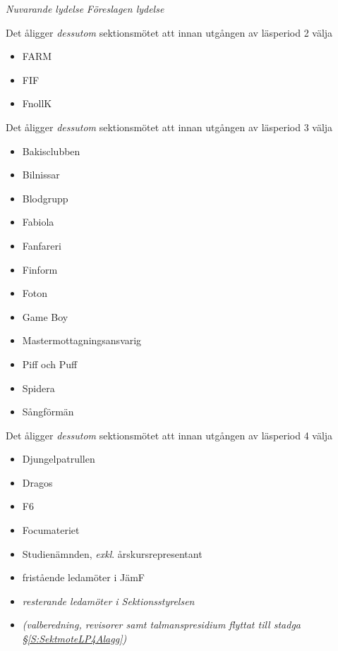 \documentclass{article}
\newenvironment{lydelse}
    {\begin{paracol}{2}%
        \emph{Nuvarande lydelse}%
        \switchcolumn%
        \emph{Föreslagen lydelse}%
    \end{paracol}%
    \begin{enumerate}[label=\thesubsection.\arabic*]%
    \begin{paracol}{2}%
    }{\end{paracol}\end{enumerate}}
\begin{document}
\begin{lydelse}
    \vspace{1.2em}
    \item Det åligger \emph{dessutom} sektionsmötet att innan utgången av läsperiod 2 välja
    \begin{itemize}
        \item FARM
        \item FIF
        \item FnollK
    \end{itemize}

    \vspace{4.8em}
    \item Det åligger \emph{dessutom} sektionsmötet att innan utgången av läsperiod 3 välja
    \begin{itemize}
        \item Bakisclubben
        \item Bilnissar
        \item Blodgrupp
        \item Fabiola
        \item Fanfareri
        \item Finform
        \item Foton
        \item Game Boy
        \item Mastermottagningsansvarig
        \item Piff och Puff
        \item Spidera
        \item Sångförmän
    \end{itemize}

    \item[]
    \item Det åligger \emph{dessutom} sektionsmötet att innan utgången av läsperiod 4 välja
    \begin{itemize}
        \item Djungelpatrullen
        \item Dragos
        \item F6
        \item Focumateriet
        \item Studienämnden, \emph{exkl}. årskursrepresentant
        \item fristående ledamöter i JämF
        \item \emph{resterande ledamöter i Sektionsstyrelsen}
        \item []\emph{(valberedning, revisorer samt talmanspresidium flyttat till stadga \S \ref{S:SektmoteLP4Alagg})}
    \end{itemize}
\end{lydelse}
\end{document}
